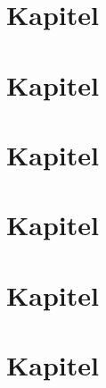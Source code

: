\chapter{Kapitel} 


\chapter{Kapitel} 


\chapter{Kapitel} 


\chapter{Kapitel} 


\chapter{Kapitel} 


\chapter{Kapitel} 


